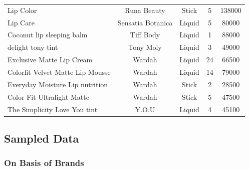 \documentclass{article}
\begin{document}
\begin{longtable}{lcccc}
    Lip Color                               & Runa Beauty       & Stick                        & 5               & 138000         \\
    Lip Care                                & Sensatia Botanica & Liquid                       & 5               & 80000          \\
    Coconut lip sleeping balm               & Tiff Body         & Liquid                       & 1               & 88000          \\
    delight tony tint                       & Tony Moly         & Liquid                       & 3               & 49000          \\
    Exclusive Matte Lip Cream               & Wardah            & Liquid                       & 24              & 66500          \\
    Colorfit Velvet Matte Lip Mousse        & Wardah            & Liquid                       & 14              & 79000          \\
    Everyday Moisture Lip nutrition         & Wardah            & Stick                        & 2               & 28500          \\
    Color Fit Ultralight Matte              & Wardah            & Stick                        & 5               & 47500          \\
    The Simplicity Love You tint            & Y.O.U             & Liquid                       & 4               & 45100          \\
\end{longtable}

\restoregeometry %

\subsection{Sampled Data}
\subsubsection{On Basis of Brands}
\end{document}
